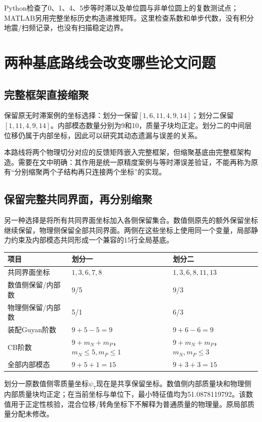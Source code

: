 \documentclass[UTF8,11pt,a4paper]{ctexart}
\begin{document}
Python检查了0、1、4、5步等时滞以及单位圆与非单位圆上的复数测试点；MATLAB另用完整坐标历史构造递推矩阵。这里检查系数和单步代数，没有积分地震/扫频记录，也没有扫描稳定边界。

\section{两种基底路线会改变哪些论文问题}

\subsection{完整框架直接缩聚}
保留原无时滞案例的坐标选择：划分一保留$[1,6,11,4,9,14]$；划分二保留$[1,11,4,9,14]$。内部模态数量分别为9和10，质量子块均正定。划分二的中间层位移仍属于内部坐标，因此可以研究其动态遗漏与误差的关系。

本路线将两个物理切分对应的反馈矩阵嵌入完整框架，但缩聚基底由完整框架构造。需要在文中明确：其作用是统一原精度案例与等时滞误差验证，不能再称为原有“分别缩聚两个子结构再只连接两个坐标”的实现。

\subsection{保留完整共同界面，再分别缩聚}
另一种选择是将所有共同界面坐标加入各侧保留集合。数值侧原先的额外保留坐标继续保留，物理侧保留全部共同界面。两侧在这些坐标上使用同一个变量，局部静力约束及内部模态共同形成一个兼容的15行全局基底。

\begin{center}\small
\begin{tabularx}{\linewidth}{lXX}
\toprule 项目&划分一&划分二\\\midrule
共同界面坐标&$1,3,6,7,8$&$1,3,6,8,11,13$\\
数值侧保留/内部数&9/5&9/3\\
物理侧保留/内部数&5/1&6/3\\
装配Guyan阶数&$9+5-5=9$&$9+6-6=9$\\
CB阶数&$9+m_N+m_P$，$m_N\le5,m_P\le1$&$9+m_N+m_P$，$m_N,m_P\le3$\\
全部内部模态&$9+5+1=15$&$9+3+3=15$\\\bottomrule
\end{tabularx}
\end{center}

划分一原数值侧零质量坐标$\psi_7$现在是共享保留坐标。数值侧内部质量块和物理侧内部质量块均正定；在当前坐标与单位下，最小特征值均为51.0878119792。该数值用于正定性核验，混合位移/转角坐标下不解释为普通质量的物理量。原局部质量分配未修改。
\end{document}
